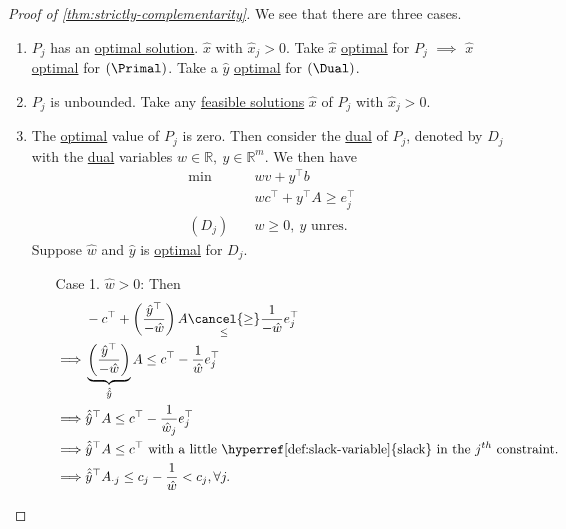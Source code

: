 \begin{proof}[Proof of \autoref{thm:strictly-complementarity}]
	We see that there are three cases.
	\begin{enumerate}
		\item \(P_{j}\) has an \hyperref[def:optimal-solution]{optimal solution}. \(\hat{x}\) with \(\hat{x}_j>0\). Take \(\hat{x}\) \hyperref[def:optimal-solution]{optimal} for \(P_{j}\) \(\implies\) \(\hat{x}\) \hyperref[def:optimal-solution]{optimal} for \((\Primal)\). Take a \(\hat{y}\) \hyperref[def:optimal-solution]{optimal} for \((\Dual)\).
		\item \(P_{j}\) is unbounded. Take any \hyperref[def:feasible-solution]{feasible solutions} \(\hat{x}\) of \(P_{j}\) with \(\hat{x}_j>0\).
		\item The \hyperref[def:optimal-solution]{optimal} value of \(P_{j}\) is zero. Then consider the \hyperref[def:dual]{dual} of \(P_{j}\), denoted by \(D_{j}\) with the \hyperref[def:dual]{dual} variables \(w\in\mathbb{R},\ y\in\mathbb{R}^m\). We then have
		      \[
			      \begin{aligned}
				      \min~        & wv + y^{\top}b                        \\
				                   & wc^{\top}+y^{\top}A \geq e_{j}^{\top} \\
				      (D_{j})\quad & w\geq 0,\ y \text{ unres.}
			      \end{aligned}
		      \]
		      Suppose \(\hat{w}\) and \(\hat{y}\) is \hyperref[def:optimal-solution]{optimal} for \(D_{j}\).
		      \begin{enumerate}
			      \item[Case 1.] \(\hat{w}>0\): Then
			            \[
				            \begin{split}
					                     & -c^{\top} + \left( \frac{\hat{y}^{\top}}{-\hat{w}} \right)A\underset{\leq }{\cancel{\geq}} \frac{1}{-\hat{w}} e_{j}^{\top}   \\
					            \implies & \underbrace{\left( \frac{\hat{y}^{\top}}{-\hat{w}} \right)}_{\hat{\hat{y}}} A\leq c^{\top} -  \frac{1}{\hat{w}} e_{j}^{\top} \\
					            \implies & \hat{\hat{y}}^{\top}A\leq c^{\top} - \frac{1}{\hat{w}_j}e_{j}^{\top}                                                         \\
					            \implies & \hat{\hat{y}}^{\top}A\leq c^{\top} \text{ with a little \hyperref[def:slack-variable]{slack} in the \(j^{th}\) constraint.}  \\
					            \implies & \hat{\hat{y}}^{\top}A_{\cdot j}\leq c_{j} - \frac{1}{\hat{w}}<c_{j}, \forall j.

\end{split}\]
\end{enumerate}
\end{enumerate}
\end{proof}
